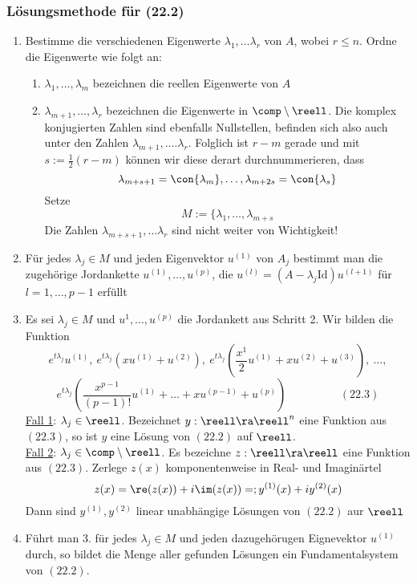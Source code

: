 \documentclass{kit}
\begin{document}
    \subsubsection{Lösungsmethode für (22.2)}
      \begin{enumerate}[label=\arabic*.]
        \item Bestimme die verschiedenen Eigenwerte $\lambda_1,\dots\lambda_r$ von $A$, wobei $r\le n$. Ordne die Eigenwerte
          wie folgt an:
          \begin{enumerate}[label=\roman*)]
            \item $\lambda_1,\dots,\lambda_m$ bezeichnen die reellen Eigenwerte von $A$
            \item $\lambda_{m+1},\dots,\lambda_r$ bezeichnen die Eigenwerte in $\comp\setminus\reell$. Die komplex
              konjugierten Zahlen sind ebenfalls Nullstellen, befinden sich also auch unter den Zahlen $\lambda_{m+1},\dots.
              \lambda_r$. Folglich ist $r-m$ gerade und mit $s:=\frac{1}{2}(r-m)$ können wir diese derart durchnummerieren,
              dass
              $$\lambda_{m+s+1}=\con{\lambda_m},\dots,\lambda_{m+2s}=\con{\lambda_s}$$
              Setze
              $$M:=\{\lambda_1,\dots,\lambda_{m+s}$$
              Die Zahlen $\lambda_{m+s+1},\dots\lambda_r$ sind nicht weiter von Wichtigkeit!
          \end{enumerate}
        \item Für jedes $\lambda_j\in M$ und jeden Eigenvektor $u^{(1)}$ von $A_j$ bestimmt man die zugehörige Jordankette
          $u^{(1)},\dots,u^{(p)}$, die $u^{(l)}=(A-\lambda_j\text{Id})u^{(l+1)}$ für $l=1,\dots,p-1$ erfüllt
        \item Es sei $\lambda_j\in M$ und $u^1,\dots,u^{(p)}$ die Jordankett aus Schritt 2. Wir bilden die Funktion
          $$e^{t\lambda_j}u^{(1)},\ e^{t\lambda_j}(xu^{(1)}+u^{(2)}),\ 
          e^{t\lambda_j}\left(\frac{x^1}{2}u^{(1)}+xu^{(2)}+u^{(3)}\right),\ \dots,$$
          $$e^{t\lambda_j}\left(\frac{x^{p-1}}{(p-1)!}u^{(1)}+\dots+xu^{(p-1)}+u^{(p)}\right)\hspace{2cm}(22.3)$$
          \underline{Fall 1}: $\lambda_j\in\reell$. Bezeichnet $y:\reell\ra\reell^n$ eine Funktion aus $(22.3)$, so ist $y$
          eine Lösung von $(22.2)$ auf $\reell$.\\
          \underline{Fall 2}: $\lambda_j\in\comp\setminus\reell$. Es bezeichne $z:\reell\ra\reell$ eine Funktion aus 
          $(22.3)$. Zerlege $z(x)$ komponentenweise in Real- und Imaginärtel
          $$z(x)=\re(z(x))+i\im(z(x))=;y^{(1)}(x)+iy^{(2)}(x)$$
          Dann sind $y^{(1)},y^{(2)}$ linear unabhängige Lösungen von $(22.2)$ aur $\reell$
        \item Führt man 3. für jedes $\lambda_j\in M$ und jeden dazugehörugen Eignevektor $u^{(1)}$ durch, so bildet die
          Menge aller gefunden Lösungen ein Fundamentalsystem von $(22.2)$.
      \end{enumerate}
\end{document}
